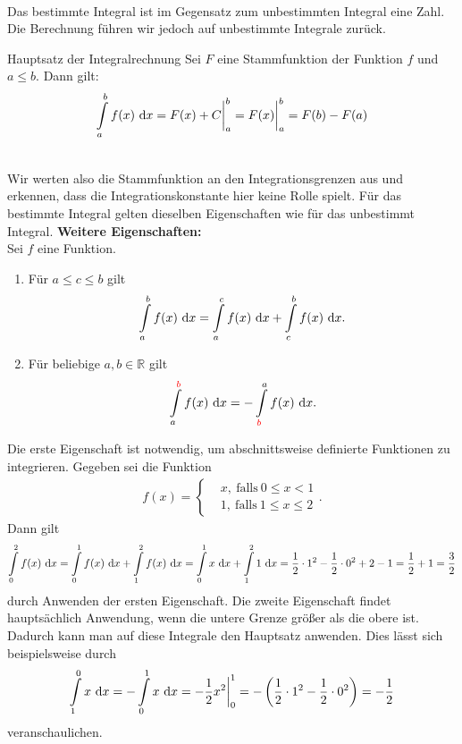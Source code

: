 \ \\
Das bestimmte Integral ist im Gegensatz zum unbestimmten Integral eine Zahl.
Die Berechnung führen wir jedoch auf unbestimmte Integrale zurück.\\
\begin{mybox}{Hauptsatz der Integralrechnung}
Sei $F$ eine Stammfunktion der Funktion $f$ und $a \leq b$.
Dann gilt:
\begin{align*}
\int \limits_a^b f(x) \ \text{\rmfamily d} x = F(x) + C \bigg|_a^b = F(x)  \bigg|_a^b = F(b) - F(a)
\end{align*}
\end{mybox}
\ \\
Wir werten also die Stammfunktion an den Integrationsgrenzen aus und erkennen, dass die Integrationskonstante hier keine Rolle spielt.
Für das bestimmte Integral gelten dieselben Eigenschaften wie für das unbestimmt Integral.
\newpage
\textbf{Weitere Eigenschaften:}\\
Sei $f$ eine Funktion.
\begin{enumerate}
\item Für $a \leq c \leq b$ gilt
\begin{align*}
\int \limits_a^b f(x) \ \text{\rmfamily d} x = \int \limits_a^c f(x) \ \text{\rmfamily d} x + \int \limits_c^b f(x) \ \text{\rmfamily d} x.
\end{align*}

\item 
Für beliebige $a,b \in \mathbb{R}$ gilt
\begin{align*}
\int \limits_a^{\textcolor{red}{b}} f(x) \ \text{\rmfamily d} x
= 
- \int \limits_{\textcolor{red}{b}}^a f(x) \ \text{\rmfamily d} x.
\end{align*}
\end{enumerate}

Die erste Eigenschaft ist notwendig, um abschnittsweise definierte Funktionen zu integrieren.
Gegeben sei die Funktion 
\begin{align*}
f(x) 
= 
\begin{cases}
&x  , \ \text{falls} \ 0 \leq x < 1\\
&1  , \ \text{falls} \ 1 \leq x \leq 2
\end{cases}.
\end{align*}
Dann gilt 
\begin{align*}
\int \limits_0^2 f(x) \ \text{\rmfamily d} x
= \int \limits_0^1 f(x) \ \text{\rmfamily d} x + \int \limits_1^2 f(x) \ \text{\rmfamily d} x
= \int \limits_0^1 x \ \text{\rmfamily d} x + \int \limits_1^2 1 \ \text{\rmfamily d} x 
= \frac{1}{2}\cdot 1^2 - \frac{1}{2} \cdot 0^2 + 2 - 1 
= \frac{1}{2  } + 1 = \frac{3}{2}
\end{align*}
durch Anwenden der ersten Eigenschaft.
Die zweite Eigenschaft findet hauptsächlich Anwendung, wenn die untere Grenze größer als die obere ist.
Dadurch kann man auf diese Integrale den Hauptsatz anwenden.
Dies lässt sich beispielsweise durch
\begin{align*}
\int \limits^0_1 x \ \text{\rmfamily d} x = - \int \limits^1_0 x \ \text{\rmfamily d} x = -\frac{1}{2} x^2 \bigg|_0^1 
= - \left( \frac{1}{2} \cdot 1^2 - \frac{1}{2} \cdot 0^2\right)  
= -\frac{1}{2} 
\end{align*}
veranschaulichen.\\
\\
